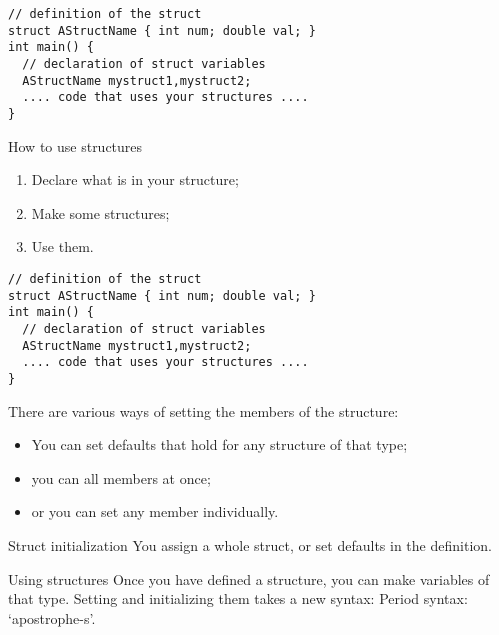 \begin{lstlisting}
// definition of the struct
struct AStructName { int num; double val; }
int main() {
  // declaration of struct variables
  AStructName mystruct1,mystruct2;
  .... code that uses your structures ....
}
\end{lstlisting}

\begin{slide}{How to use structures}
  \label{sl:structinprog}
  \begin{enumerate}
  \item Declare what is in your structure;
  \item Make some structures;
  \item Use them.
  \end{enumerate}
\begin{lstlisting}
// definition of the struct
struct AStructName { int num; double val; }
int main() {
  // declaration of struct variables
  AStructName mystruct1,mystruct2;
  .... code that uses your structures ....
}
\end{lstlisting}
\end{slide}

There are various ways of setting the members of the structure:
\begin{itemize}
\item You can set defaults that hold for any structure of that type;
\item you can all members at once;
\item or you can set any member individually.
\end{itemize}

\begin{block}{Struct initialization}
  \label{sl:structinit}
  You assign a whole struct, or set defaults in the definition.
\end{block}

\begin{block}{Using structures}
  \label{sl:struct-use}
  Once you have defined a structure, you can make variables of that
  type. Setting and initializing them takes a new syntax:
  Period syntax: `apostrophe-s'.
\end{block}


